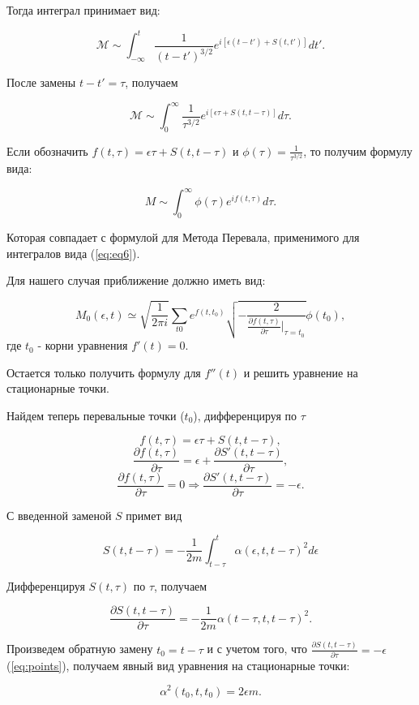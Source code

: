 \documentclass[%
bachelor,    %
natbib,      %
subf,        %
href,        %
colorlinks,  %
]{disser}
\newcommand{\cM}{\mathcal{M}}
\begin{document}
Тогда интеграл принимает вид:

$$
\cM \sim \int_{-\infty}^{t} \frac{1}{(t-t')^{3/2}} e^{i[\epsilon (t - t') + S(t, t')]} dt'.
$$

После замены $t - t' = \tau$, получаем 

$$
\cM \sim \int_{0}^{\infty}\frac{1}{{\tau}^{3/2}}e^{i [\epsilon \tau + S(t, t-\tau)]} d\tau.
$$

Если обозначить
$
f(t, \tau) = \epsilon \tau + S(t, t-\tau) 
$ и
$
\phi(\tau) = \frac{1}{{\tau}^{3/2}} 
$, то получим формулу вида:

$$
M \sim \int_{0}^{\infty} \phi(\tau) e^{i f(t, \tau)} d\tau.
$$

Которая совпадает с формулой для Метода Перевала, применимого для интегралов вида (\ref{eq:eq6}).

Для нашего случая приближение должно иметь вид:

$$
M_0(\epsilon, t) \simeq \sqrt{\frac{1}{2\pi i }}\sum_{t0}e^{f(t, t_0)} \sqrt{-\frac{2}{\frac{\partial f(t, \tau)}{\partial \tau}|_{\tau = t_0}}} \phi(t_0),
$$ где $t_0$ - корни уравнения $f'(t) = 0$.

Остается только получить формулу для $f''(t)$ и решить уравнение на стационарные точки.

Найдем теперь перевальные точки ($t_0$), дифференцируя по $\tau$

$$
f(t, \tau) = \epsilon \tau + S(t, t-\tau),
$$
$$
\frac{\partial f(t, \tau)}{\partial \tau} = \epsilon + \frac{\partial S'(t, t-\tau)}{\partial\tau},
$$
\begin{equation}\label{eq:points}
\frac{\partial f(t, \tau)}{\partial \tau}=0 \Rightarrow \frac{\partial S'(t, t-\tau)}{\partial\tau} = -\epsilon.
\end{equation}

С введенной заменой $S$ примет вид

$$
S(t, t-\tau) = -\frac{1}{2m}\int_{t-\tau}^{t} \alpha(\epsilon, t, t-\tau)^2 d\epsilon
$$

Дифференцируя $S(t, \tau)$ по $\tau$, получаем

$$
\frac{\partial S(t, t-\tau)}{\partial\tau} = -\frac{1}{2m} \alpha(t-\tau, t, t-\tau)^2.
$$

Произведем обратную замену $t_0 = t-\tau$ и с учетом того, что $\frac{\partial S(t, t-\tau)}{\partial\tau} = -\epsilon$ (\ref{eq:points}), получаем явный вид уравнения на стационарные точки:

\begin{equation}\label{eq:solvepoints}
\alpha ^2 (t_0, t, t_0) = 2 \epsilon m.
\end{equation}
\end{document}
